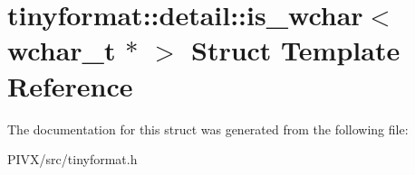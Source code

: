 \hypertarget{structtinyformat_1_1detail_1_1is__wchar_3_01wchar__t_01_5_01_4}{}\section{tinyformat\+:\+:detail\+:\+:is\+\_\+wchar$<$ wchar\+\_\+t $\ast$ $>$ Struct Template Reference}
\label{structtinyformat_1_1detail_1_1is__wchar_3_01wchar__t_01_5_01_4}


The documentation for this struct was generated from the following file\+:\begin{DoxyCompactItemize}
\item 
P\+I\+V\+X/src/tinyformat.\+h\end{DoxyCompactItemize}
